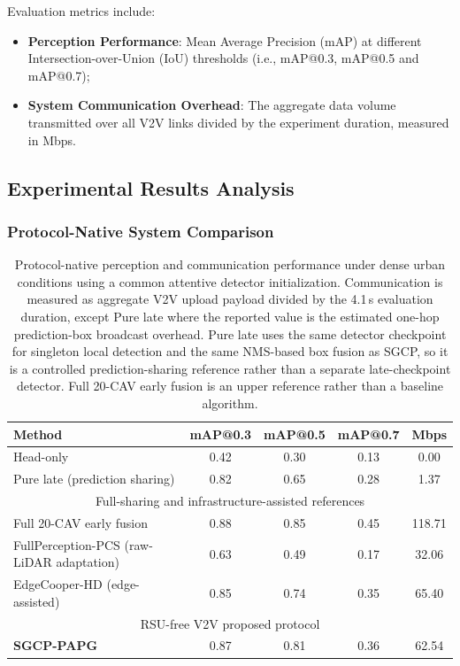 \documentclass[conference]{IEEEtran}
\begin{document}
Evaluation metrics include:
\begin{itemize}
    \item \textbf{Perception Performance}: Mean Average Precision (mAP) at different Intersection-over-Union (IoU) thresholds (i.e., mAP@0.3, mAP@0.5 and mAP@0.7);
    \item \textbf{System Communication Overhead}: The aggregate data volume transmitted over all V2V links divided by the experiment duration, measured in Mbps.
    
\end{itemize}

\subsection{Experimental Results Analysis}

\subsubsection{Protocol-Native System Comparison}

\begin{table}[t]
\centering
\caption{Protocol-native perception and communication performance under dense urban conditions using a common attentive detector initialization. Communication is measured as aggregate V2V upload payload divided by the 4.1\,s evaluation duration, except Pure late where the reported value is the estimated one-hop prediction-box broadcast overhead. Pure late uses the same detector checkpoint for singleton local detection and the same NMS-based box fusion as SGCP, so it is a controlled prediction-sharing reference rather than a separate late-checkpoint detector. Full 20-CAV early fusion is an upper reference rather than a baseline algorithm.}
\label{tab:mAP}
\begin{tabular}{|l|ccc|c|}
\hline
Method & mAP@0.3 & mAP@0.5 & mAP@0.7 & Mbps \\
\hline
Head-only & 0.42 & 0.30 & 0.13 & 0.00 \\
Pure late (prediction sharing) & 0.82 & 0.65 & 0.28 & 1.37 \\
\hline
\multicolumn{5}{|c|}{Full-sharing and infrastructure-assisted references} \\
\hline
Full 20-CAV early fusion & 0.88 & 0.85 & 0.45 & 118.71 \\
FullPerception-PCS (raw-LiDAR adaptation) & 0.63 & 0.49 & 0.17 & 32.06 \\
EdgeCooper-HD (edge-assisted) & 0.85 & 0.74 & 0.35 & 65.40 \\
\hline
\multicolumn{5}{|c|}{RSU-free V2V proposed protocol} \\
\hline
\textbf{SGCP-PAPG} & 0.87 & 0.81 & 0.36 & 62.54 \\
\hline
\end{tabular}
\end{table}
\end{document}

